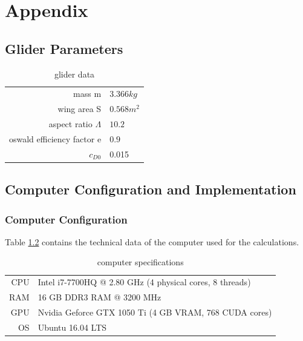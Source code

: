 
\chapter{Appendix}
\section{Glider Parameters}
\label{appendix_A}

\begin{table}[h]
	\begin{center}
		\begin{tabular}{r|l}
			mass m& $3.366 kg$\\
			wing area S & $0.568 m^2$ \\
			aspect ratio $\Lambda$ & $10.2$ \\
			oswald efficiency factor e& $0.9$ \\
			$c_{D0}$ & 0.015 \\
		\end{tabular}
		\caption{glider data}
		\label{tab:glider_data}
	\end{center}
\end{table}

\newpage
\section{Computer Configuration and Implementation}
\label{appendix_B}
\subsection{Computer Configuration}
Table \ref{tab:pc_specs} contains the technical data of the computer used for the calculations.

\begin{table}[h]
	\begin{center}
		\begin{tabular}{r|l}
			CPU & Intel i7-7700HQ @ 2.80 GHz (4 physical cores, 8 threads) \\
			RAM\nomenclature[A]{RAM}{random access memory} & 16 GB DDR3 RAM @ 3200 MHz \\
			GPU & Nvidia Geforce GTX 1050 Ti (4 GB VRAM, 768 CUDA cores) \\
			OS & Ubuntu 16.04 LTS
		\end{tabular}
	\caption{computer specifications}
	\label{tab:pc_specs}
	\end{center}
\end{table}

